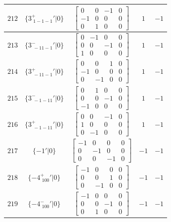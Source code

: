 \documentclass[fleqn,8pt]{jsarticle}
\begin{document}
\begin{longtable}{ccccc}
$ 212 $ & $ \{3^{+}_{\,\,1-1-1}{}'|0\} $ & $ \begin{bmatrix} 0 & 0 & -1 & 0 \\ -1 & 0 & 0 & 0 \\ 0 & 1 & 0 & 0 \end{bmatrix} $ & $ 1 $ & $ -1 $ \\ \hline
$ 213 $ & $ \{3^{-}_{\,\,-11-1}{}'|0\} $ & $ \begin{bmatrix} 0 & -1 & 0 & 0 \\ 0 & 0 & -1 & 0 \\ 1 & 0 & 0 & 0 \end{bmatrix} $ & $ 1 $ & $ -1 $ \\ \hline
$ 214 $ & $ \{3^{+}_{\,\,-11-1}{}'|0\} $ & $ \begin{bmatrix} 0 & 0 & 1 & 0 \\ -1 & 0 & 0 & 0 \\ 0 & -1 & 0 & 0 \end{bmatrix} $ & $ 1 $ & $ -1 $ \\ \hline
$ 215 $ & $ \{3^{-}_{\,\,-1-11}{}'|0\} $ & $ \begin{bmatrix} 0 & 1 & 0 & 0 \\ 0 & 0 & -1 & 0 \\ -1 & 0 & 0 & 0 \end{bmatrix} $ & $ 1 $ & $ -1 $ \\ \hline
$ 216 $ & $ \{3^{+}_{\,\,-1-11}{}'|0\} $ & $ \begin{bmatrix} 0 & 0 & -1 & 0 \\ 1 & 0 & 0 & 0 \\ 0 & -1 & 0 & 0 \end{bmatrix} $ & $ 1 $ & $ -1 $ \\ \hline
$ 217 $ & $ \{-1{}'|0\} $ & $ \begin{bmatrix} -1 & 0 & 0 & 0 \\ 0 & -1 & 0 & 0 \\ 0 & 0 & -1 & 0 \end{bmatrix} $ & $ -1 $ & $ -1 $ \\ \hline
$ 218 $ & $ \{-4^{+}_{\,\,100}{}'|0\} $ & $ \begin{bmatrix} -1 & 0 & 0 & 0 \\ 0 & 0 & 1 & 0 \\ 0 & -1 & 0 & 0 \end{bmatrix} $ & $ -1 $ & $ -1 $ \\ \hline
$ 219 $ & $ \{-4^{-}_{\,\,100}{}'|0\} $ & $ \begin{bmatrix} -1 & 0 & 0 & 0 \\ 0 & 0 & -1 & 0 \\ 0 & 1 & 0 & 0 \end{bmatrix} $ & $ -1 $ & $ -1 $ \\ \hline

\end{longtable}
\end{document}
